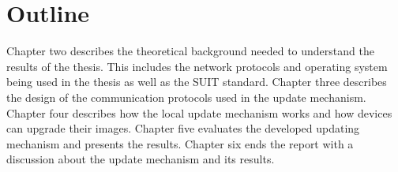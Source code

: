 \documentclass[0-thesis.tex]{subfiles}
\begin{document}
\section{Outline}
Chapter two describes the theoretical background needed to understand the results of the
thesis. This includes the network protocols and operating system being used in the thesis
as well as the SUIT standard. Chapter three describes the design of the communication
protocols used in the update mechanism. Chapter four describes how the local update
mechanism works and how devices can upgrade their images. Chapter five evaluates the
developed updating mechanism and presents the results. Chapter six ends the report with a
discussion about the update mechanism and its results.
\end{document}

